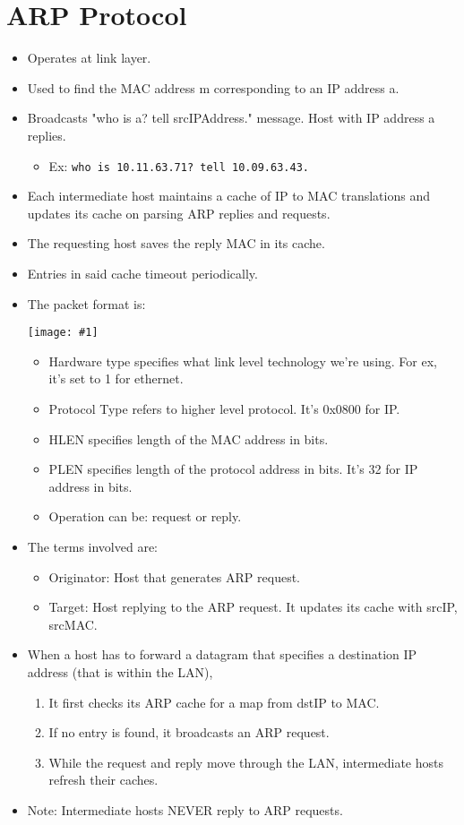 \documentclass{report}
\makeatletter
\def\maxwidth#1{\ifdim\Gin@nat@width>#1 #1\else\Gin@nat@width\fi}
\newcommand{\mygraphic}[1]{
\begin{center}
    \texttt{[image: \#1]}
\end{center}
}
\makeatother
\begin{document}
\section{ARP Protocol}
\label{sec:arp}
\begin{itemize}
\item Operates at link layer.
\item Used to find the MAC address m corresponding to an IP address a.
\item Broadcasts "who is a? tell srcIPAddress." message. Host with IP address a replies.
\begin{itemize}
\item Ex: \texttt{who is 10.11.63.71? tell 10.09.63.43.}
\end{itemize}
\item Each intermediate host maintains a cache of IP to MAC translations and updates its cache on parsing ARP replies and requests.
\item The requesting host saves the reply MAC in its cache.
\item Entries in said cache timeout periodically.
\item The packet format is:
\mygraphic{rsrc/arppacket.png}
\begin{itemize}
\item Hardware type specifies what link level technology we're using. For ex, it's set to 1 for ethernet.
\item Protocol Type refers to higher level protocol. It's 0x0800 for IP.
\item HLEN specifies length of the MAC address in bits.
\item PLEN specifies length of the protocol address in bits. It's 32 for IP address in bits.
\item Operation can be: request or reply.
\end{itemize}
\item The terms involved are:
\begin{itemize}
\item Originator: Host that generates ARP request.
\item Target: Host replying to the ARP request. It updates its cache with srcIP, srcMAC.
\end{itemize}
\item When a host has to forward a datagram that specifies a destination IP address (that is within the LAN),
\begin{enumerate}
    \item It first checks its ARP cache for a map from dstIP to MAC.
    \item If no entry is found, it broadcasts an ARP request.
    \item While the request and reply move through the LAN, intermediate hosts refresh their caches.
\end{enumerate}
\item Note: Intermediate hosts NEVER reply to ARP requests.
\end{itemize}
\end{document}
